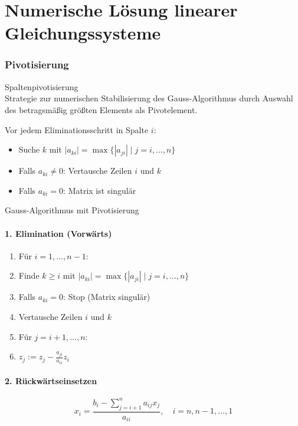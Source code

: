\section{Numerische Lösung linearer Gleichungssysteme}

\subsubsection{Pivotisierung}

\begin{concept}{Spaltenpivotisierung}\\
Strategie zur numerischen Stabilisierung des Gauss-Algorithmus durch Auswahl des betragsmäßig größten Elements als Pivotelement.

Vor jedem Eliminationsschritt in Spalte $i$:
\begin{itemize}
    \item Suche $k$ mit $|a_{ki}| = \max\{|a_{ji}| \mid j = i,\ldots,n\}$
    \item Falls $a_{ki} \neq 0$: Vertausche Zeilen $i$ und $k$
    \item Falls $a_{ki} = 0$: Matrix ist singulär
\end{itemize}
\end{concept}

\begin{KR}{Gauss-Algorithmus mit Pivotisierung}
\paragraph{1. Elimination (Vorwärts)}
\begin{enumerate}
    \item Für $i=1,\ldots,n-1$:
    \item \quad Finde $k \geq i$ mit $|a_{ki}| = \max\{|a_{ji}| \mid j = i,\ldots,n\}$
    \item \quad Falls $a_{ki} = 0$: Stop (Matrix singulär)
    \item \quad Vertausche Zeilen $i$ und $k$
    \item \quad Für $j=i+1,\ldots,n$:
    \item \quad\quad $z_j := z_j - \frac{a_{ji}}{a_{ii}}z_i$
\end{enumerate}

\paragraph{2. Rückwärtseinsetzen}
$$x_i = \frac{b_i - \sum_{j=i+1}^n a_{ij}x_j}{a_{ii}}, \quad i=n,n-1,\ldots,1$$
\end{KR}


